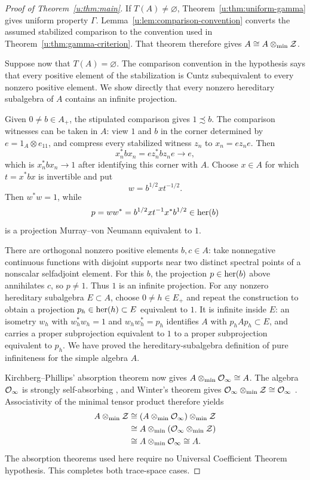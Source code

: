 \begin{proof}[Proof of Theorem~\ref{u:thm:main}]
If $T(A)\ne\varnothing$, Theorem~\ref{u:thm:uniform-gamma} gives
uniform property $\Gamma$.  Lemma~\ref{u:lem:comparison-convention}
converts the assumed stabilized comparison to the convention used in
Theorem~\ref{u:thm:gamma-criterion}.  That theorem therefore gives
$A\cong A\otimes_{\min}\mathcal Z$.

Suppose now that $T(A)=\varnothing$.  The comparison convention in
the hypothesis says that every positive element of the stabilization
is Cuntz subequivalent to every nonzero positive element.  We show
directly that every nonzero hereditary subalgebra of $A$ contains an
infinite projection.

Given $0\ne b\in A_+$, the stipulated comparison gives
$1\precsim b$.  The comparison witnesses can be taken in $A$:
view $1$ and $b$ in the corner determined by
$e=1_A\otimes e_{11}$, and compress every stabilized witness $z_n$
to $x_n=ez_ne$.  Then
\[
  x_n^*b x_n=e z_n^*b z_n e\longrightarrow e,
\]
which is $x_n^*b x_n\to1$ after identifying this corner with $A$.
Choose $x\in A$ for which $t=x^*b x$ is invertible and put
\[
  w=b^{1/2}x t^{-1/2}.
\]
Then $w^*w=1$, while
\[
  p=ww^*=b^{1/2}x t^{-1}x^*b^{1/2}\in\operatorname{her}(b)
\]
is a projection Murray--von Neumann equivalent to $1$.

There are orthogonal nonzero positive elements $b,c\in A$: take
nonnegative continuous functions with disjoint supports near two
distinct spectral points of a nonscalar selfadjoint element.
For this $b$, the projection $p\in\operatorname{her}(b)$ above annihilates $c$,
so $p\ne1$.  Thus $1$ is an infinite projection.  For any nonzero
hereditary subalgebra $E\subset A$, choose $0\ne h\in E_+$ and
repeat the construction to obtain a projection $p_h\in\operatorname{her}(h)
\subset E$ equivalent to $1$.  It is infinite inside $E$: an
isometry $w_h$ with $w_h^*w_h=1$ and $w_hw_h^*=p_h$ identifies
$A$ with $p_hAp_h\subset E$, and carries a proper subprojection
equivalent to $1$ to a proper subprojection equivalent to $p_h$.
We have proved the hereditary-subalgebra definition of pure
infiniteness for the simple algebra $A$.

Kirchberg--Phillips' absorption theorem
\cite[Theorem~3.14]{KP} now gives $A\otimes_{\min}\mathcal O_{\infty}\cong A$.
The algebra $\mathcal O_{\infty}$ is strongly self-absorbing
\cite[Examples~1.14(ii)]{TW}, and Winter's theorem gives
$\mathcal O_{\infty}\otimes_{\min}\mathcal Z\cong\mathcal O_{\infty}$
\cite[Theorem~3.1]{WinterSSA}.  Associativity of the minimal tensor
product therefore yields
\[
\begin{split}
  A\otimes_{\min}\mathcal Z
    &\cong(A\otimes_{\min}\mathcal O_{\infty})\otimes_{\min}\mathcal Z\\
    &\cong A\otimes_{\min}(\mathcal O_{\infty}\otimes_{\min}\mathcal Z)\\
    &\cong A\otimes_{\min}\mathcal O_{\infty}
     \cong A.
\end{split}
\]
The absorption theorems used here require no Universal Coefficient
Theorem hypothesis.  This completes both trace-space cases.
\end{proof}
